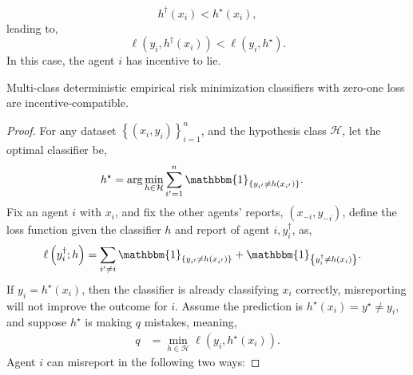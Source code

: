 \documentclass{article}
\begin{document}
\begin{equation} 
h^{\dagger}\left(x_{i}\right) < h^\star \left(x_{i}\right),
\end{equation}
leading to,
\begin{equation} 
\ell\left(y_{i},  h^{\dagger}\left(x_{i}\right)\right) < \ell\left(y_{i}, h^\star \right).
\end{equation}
In this case, the agent $i $ has incentive to lie.
\newline \newline
\begin{prop} \label{prop:zolog} 
Multi-class deterministic empirical risk minimization classifiers with zero-one loss are incentive-compatible.
\end{prop}
\begin{proof} \label{proof:zologpf} 
For any dataset $\left\{\left(x_{i}, y_{i}\right)\right\}_{i=1}^{n}$, and the hypothesis class $\mathcal{H}$, let the optimal classifier be,
\begin{align*}
h^\star  &= \arg\displaystyle\min_{h \in \mathcal{H}} \displaystyle\sum_{i'=1}^{n} \mathbbm{1}_{\left\{y_{i'} \neq  h\left(x_{i'}\right)\right\}}.
\end{align*}
Fix an agent $i $ with $x_{i}$, and fix the other agents' reports, $\left(x_{-i}, y_{-i}\right)$, define the loss function given the classifier $h $ and report of agent $i , y^{\dagger}_{i}$, as,
\begin{align*}
\ell\left(y^{\dagger}_{i}; h\right) &= \displaystyle\sum_{i' \neq  i} \mathbbm{1}_{\left\{y_{i'} \neq  h\left(x_{i'}\right)\right\}} + \mathbbm{1}_{\left\{y^{\dagger}_{i} \neq  h\left(x_{i}\right)\right\}}.
\end{align*}
If $y_{i} = h^\star \left(x_{i}\right)$, then the classifier is already classifying $x_{i}$ correctly, misreporting will not improve the outcome for $i $. Assume the prediction is $h^\star \left(x_{i}\right) = y^\star  \neq  y_{i}$, and suppose $h^\star $ is making $q $ mistakes, meaning,
\begin{align*}
q  &= \displaystyle\min_{h \in \mathcal{H}} \ell\left(y_{i}, h^\star \left(x_{i}\right)\right).
\end{align*}
Agent $i $ can misreport in the following two ways:
\end{proof}
\end{document}
